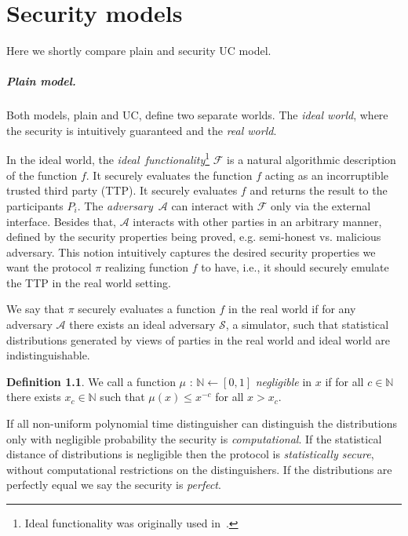 \documentclass[
  digital, %
  twoside, %
  table,   %
  lof,     %
  lot,     %
]{fithesis3}
\newcounter{ph4_show_guides}
\theoremstyle{definition}
\newtheorem{definition}{Definition}
\theoremstyle{remark}
\begin{document}


\appendix 

\chapter{Security models}\label{apx:uc}
Here we shortly compare plain and security UC model.

\paragraph{Plain model.}
Both models, plain and UC, define two separate worlds.
The \emph{ideal world}, where the security is intuitively guaranteed and the \emph{real world}.

In the ideal world, the \emph{ideal~functionality}\footnote{Ideal functionality was originally used in~\cite{GMW87}.} $\mathcal{F}$ is a natural algorithmic description of the function $f$. It securely evaluates the function $f$ acting as an incorruptible trusted third party (TTP). It securely evaluates $f$ and returns the result to the participants $P_i$. The \emph{adversary}~$\mathcal{A}$ can interact with $\mathcal{F}$ only via the external interface. Besides that, $\mathcal{A}$ interacts with other parties in an arbitrary manner, defined by the security properties being proved, e.g. semi-honest vs. malicious adversary.
This notion intuitively captures the desired security properties we want the protocol $\pi$ realizing function $f$ to have, i.e., it should securely emulate the TTP in the real world setting.

We say that $\pi$ securely evaluates a function $f$ in the real world if for any adversary $\mathcal{A}$ there exists an ideal adversary $\mathcal{S}$, a simulator, such that statistical distributions generated by views of parties in the real world and ideal world are indistinguishable. 

\begin{definition}
	We call a function $\mu$ : $\mathbb{N} \leftarrow [0,1]$ \emph{negligible} in $x$ if for all $c \in \mathbb{N}$ there exists $x_c \in \mathbb{N}$ such that $\mu(x) \leq x^{-c}$ for all $x > x_c$.
\end{definition}

If all non-uniform polynomial time distinguisher can distinguish the distributions only with negligible probability the security is \emph{computational}. If the statistical distance of distributions is negligible then the protocol is \emph{statistically secure}, without computational restrictions on the distinguishers.
If the distributions are perfectly equal we say the security is \emph{perfect}. 
\end{document}
